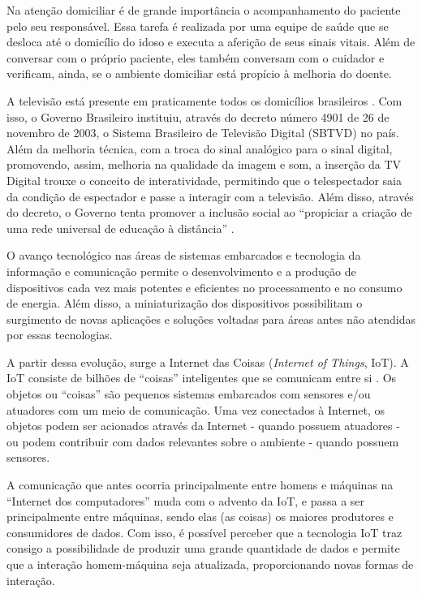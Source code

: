Na atenção domiciliar é de grande importância o acompanhamento do paciente pelo seu responsável.
Essa tarefa é realizada por uma equipe de saúde que se desloca até o domicílio do
idoso e executa a aferição de seus sinais vitais. Além de conversar com o
próprio paciente, eles também conversam com o cuidador e verificam, ainda, se o
ambiente domiciliar está propício à melhoria do doente.

A televisão está presente em praticamente todos os  domicílios brasileiros \cite{ibge2015tv}. 
Com isso, o Governo Brasileiro instituiu, através do decreto número 4901 de 26 de
novembro de 2003, o Sistema Brasileiro de Televisão Digital (SBTVD) no país.
Além da melhoria técnica, com a troca do sinal analógico para o sinal  digital,
promovendo, assim, melhoria na qualidade da imagem e som, a inserção  da TV
Digital trouxe o conceito de interatividade, permitindo que o  telespectador
saia da condição de espectador e passe a interagir com a  televisão. Além disso,
através do decreto, o Governo tenta promover a inclusão social ao ``propiciar a
criação de uma rede universal de educação à distância''
\cite{digitaltv2015decree}.

O avanço tecnológico nas áreas de sistemas embarcados e tecnologia da informação
e comunicação permite o desenvolvimento e a produção de dispositivos cada vez
mais potentes e eficientes no processamento e no consumo de energia. Além disso,
a miniaturização dos dispositivos possibilitam o surgimento de novas aplicações
e soluções voltadas para áreas antes não atendidas por essas tecnologias.

A partir dessa evolução, surge a Internet das Coisas (\textit{Internet of Things},
IoT). A IoT consiste de bilhões de ``coisas'' inteligentes que se comunicam entre
si \cite{li2015internet}. Os objetos ou ``coisas'' são pequenos sistemas embarcados
com sensores e/ou atuadores com um meio de comunicação. Uma vez conectados à Internet, 
os objetos podem ser acionados através da Internet - quando possuem atuadores - ou
podem contribuir com dados relevantes sobre o ambiente - quando possuem sensores.

A comunicação que antes ocorria principalmente entre homens e máquinas na ``Internet
dos computadores'' muda com o advento da IoT, e passa a ser principalmente entre
máquinas, sendo elas (as coisas) os maiores produtores e consumidores de dados.
Com isso, é possível perceber que a tecnologia IoT traz consigo a possibilidade de
produzir uma grande quantidade de dados e permite que a interação homem-máquina
seja atualizada, proporcionando novas formas de interação.


